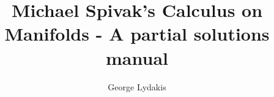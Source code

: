 \documentclass[a4paper, 11pt]{book}
\begin{document}
\title{Michael Spivak's Calculus on Manifolds - A partial solutions manual}
\author{George Lydakis}
\maketitle

\setcounter{tocdepth}{2}
\tableofcontents


%
%


\end{document}
